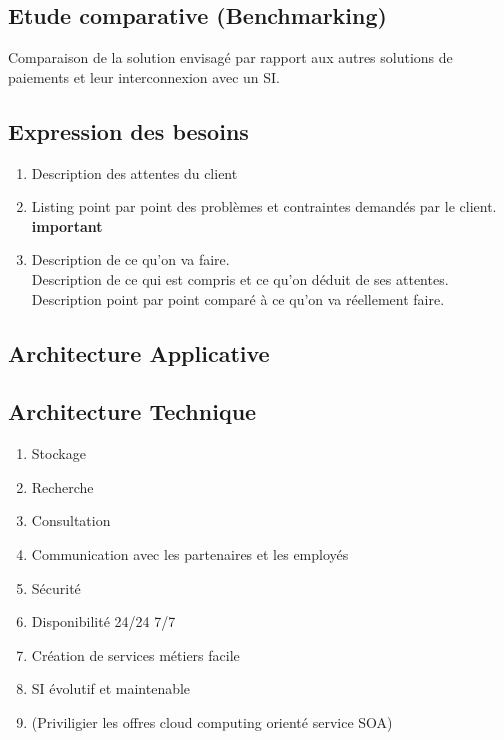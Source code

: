 \documentclass[11pt, a4paper]{article}
\begin{document}
\subsection{Etude comparative (Benchmarking)}
Comparaison de la solution envisagé par rapport aux autres solutions de
paiements et leur interconnexion avec un SI.

\subsection{Expression des besoins}
\begin{enumerate}
  \item Description des attentes du client
  \item Listing point par point des problèmes et contraintes demandés par le
    client. \textbf{important}
  \item Description de ce qu'on va faire.
    \\ Description de ce qui est compris et ce qu'on déduit de ses attentes.
    \\ Description point par point comparé à ce qu'on va réellement faire.
\end{enumerate}

\subsection{Architecture Applicative}

\subsection{Architecture Technique}
\begin{enumerate}
  \item Stockage
  \item Recherche
  \item Consultation
  \item Communication avec les partenaires et les employés
  \item Sécurité
  \item Disponibilité 24/24 7/7
  \item Création de services métiers facile
  \item SI évolutif et maintenable
  \item (Priviligier les offres cloud computing orienté service SOA)
\end{enumerate}
\end{document}

